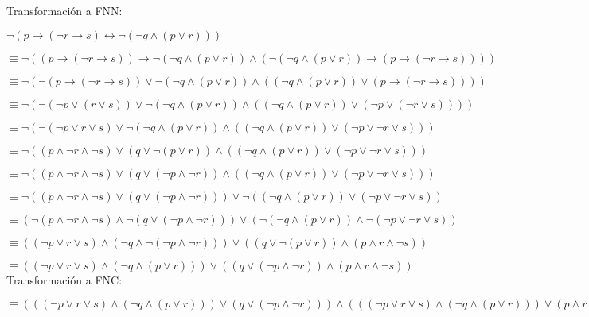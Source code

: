 \documentclass{article}
\begin{document}
Transformación a FNN:

$\lnot (p \rightarrow ( \lnot r \rightarrow s) \leftrightarrow  \lnot ( \lnot q \land (p \lor r)))$

$\equiv \lnot ((p \rightarrow ( \lnot r \rightarrow s)) \rightarrow  \lnot ( \lnot q \land (p \lor r)) \land ( \lnot ( \lnot q \land (p \lor r)) \rightarrow (p \rightarrow ( \lnot r \rightarrow s))))$

$\equiv \lnot ( \lnot (p \rightarrow ( \lnot r \rightarrow s)) \lor  \lnot ( \lnot q \land (p \lor r)) \land (( \lnot q \land (p \lor r)) \lor (p \rightarrow ( \lnot r \rightarrow s))))$

$\equiv \lnot ( \lnot ( \lnot p \lor (r \lor s)) \lor  \lnot ( \lnot q \land (p \lor r)) \land (( \lnot q \land (p \lor r)) \lor ( \lnot p \lor ( \lnot r \lor s))))$

$\equiv \lnot ( \lnot ( \lnot p \lor r \lor s) \lor  \lnot ( \lnot q \land (p \lor r)) \land (( \lnot q \land (p \lor r)) \lor ( \lnot p \lor  \lnot r \lor s)))$

$\equiv \lnot ((p \land  \lnot r \land  \lnot s) \lor (q \lor  \lnot (p \lor r)) \land (( \lnot q \land (p \lor r)) \lor ( \lnot p \lor  \lnot r \lor s)))$

$\equiv \lnot ((p \land  \lnot r \land  \lnot s) \lor (q \lor ( \lnot p \land  \lnot r)) \land (( \lnot q \land (p \lor r)) \lor ( \lnot p \lor  \lnot r \lor s)))$

$\equiv \lnot ((p \land  \lnot r \land  \lnot s) \lor (q \lor ( \lnot p \land  \lnot r))) \lor  \lnot (( \lnot q \land (p \lor r)) \lor ( \lnot p \lor  \lnot r \lor s))$

$\equiv ( \lnot (p \land  \lnot r \land  \lnot s) \land  \lnot (q \lor ( \lnot p \land  \lnot r))) \lor ( \lnot ( \lnot q \land (p \lor r)) \land  \lnot ( \lnot p \lor  \lnot r \lor s))$

$\equiv (( \lnot p \lor r \lor s) \land ( \lnot q \land  \lnot ( \lnot p \land  \lnot r))) \lor ((q \lor  \lnot (p \lor r)) \land (p \land r \land  \lnot s))$

$\equiv (( \lnot p \lor r \lor s) \land ( \lnot q \land (p \lor r))) \lor ((q \lor ( \lnot p \land  \lnot r)) \land (p \land r \land  \lnot s))$\\

Transformación a FNC:

$\equiv ((( \lnot p \lor r \lor s) \land ( \lnot q \land (p \lor r))) \lor (q \lor ( \lnot p \land  \lnot r))) \land ((( \lnot p \lor r \lor s) \land ( \lnot q \land (p \lor r))) \lor (p \land r \land  \lnot s))$
\end{document}
